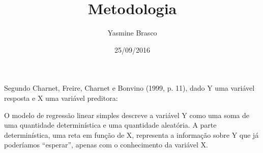 \documentclass[12pt, a4paper]{article}
\begin{document}
	\title{Metodologia}
	\author{Yasmine Brasco}
	\date{25/09/2016}

Segundo Charnet, Freire, Charnet e Bonvino (1999, p. 11), dado Y uma variável resposta e X uma variável preditora:


O modelo de regressão linear simples descreve a variável Y como uma soma de uma quantidade determinística e uma quantidade aleatória. A parte determinística, uma reta em função de X, representa a informação sobre Y que já poderíamos ``esperar'', apenas com o conhecimento da variável X.

\end{document}
